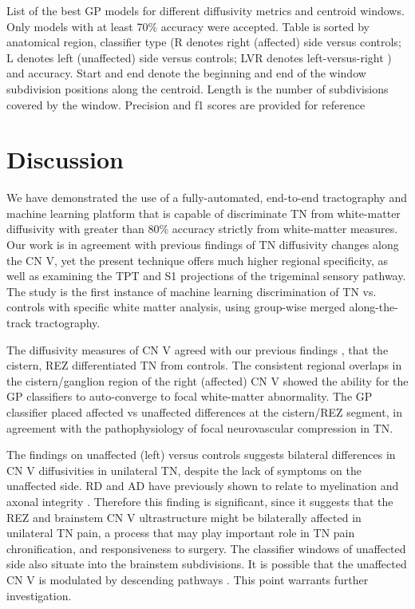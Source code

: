 \begin{table}[p]
\centering
\small
{}
\caption{List of the best GP models for different diffusivity metrics and centroid windows. Only models with at least 70\% accuracy were accepted. Table is sorted by anatomical region, classifier type (R denotes right (affected) side versus controls; L denotes left (unaffected) side versus controls; LVR denotes left-versus-right ) and accuracy. Start and end denote the beginning and end of the window subdivision positions along the centroid. Length is the number of subdivisions covered by the window. Precision and f1 scores are provided for reference}
\label{table:GP}
\end{table}

\section{Discussion}
We have demonstrated the use of a fully-automated, end-to-end tractography and machine learning platform that is capable of discriminate TN from white-matter diffusivity with greater than 80\% accuracy strictly from white-matter measures. Our work is in agreement with previous findings of TN diffusivity changes along the CN V, yet the present technique offers much higher regional specificity, as well as examining the TPT and S1 projections of the trigeminal sensory pathway. The study is the first instance of machine learning discrimination of TN vs. controls with specific white matter analysis, using group-wise merged along-the-track tractography. 

The diffusivity measures of CN V agreed with our previous findings \cite{Chen2016a}, that the cistern, REZ differentiated TN from controls. The consistent regional overlaps in the cistern/ganglion region of the right (affected) CN V showed the ability for the GP classifiers to auto-converge to focal white-matter abnormality. The GP classifier placed affected vs unaffected differences at the cistern/REZ segment, in agreement with the pathophysiology of focal neurovascular compression in TN. 

The findings on unaffected (left) versus controls suggests bilateral differences in CN V diffusivities in unilateral TN, despite the lack of symptoms on the unaffected side. RD and AD have previously shown to relate to myelination \cite{Song2002} and axonal integrity \cite{Budde2009}. Therefore this finding is significant, since it suggests that the REZ and brainstem CN V ultrastructure might be bilaterally affected in unilateral TN pain, a process that may play important role in TN pain chronification, and responsiveness to surgery. The classifier windows of unaffected side also situate into the brainstem subdivisions. It is possible that the unaffected CN V is modulated by descending pathways \cite{Davis2013,Bushnell2013}. This point warrants further investigation.

